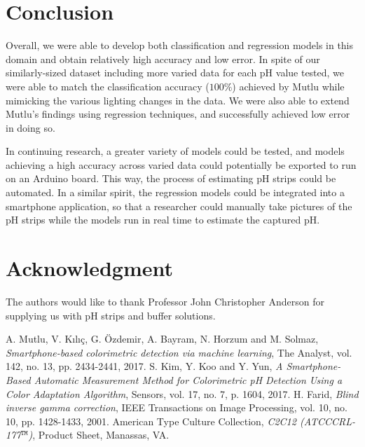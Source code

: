 \documentclass[journal]{IEEEtran}
\begin{document}
\section{Conclusion}
Overall, we were able to develop both classification and regression models in this domain and obtain relatively high accuracy and low error. In spite of our similarly-sized dataset including more varied data for each pH value tested, we were able to match the classification accuracy ($100\%$) achieved by Mutlu while mimicking the various lighting changes in the data. We were also able to extend Mutlu’s findings using regression techniques, and successfully achieved low error in doing so.

In continuing research, a greater variety of models could be tested, and models achieving a high accuracy across varied data could potentially be exported to run on an Arduino board. This way, the process of estimating pH strips could be automated. In a similar spirit, the regression models could be integrated into a smartphone application, so that a researcher could manually take pictures of the pH strips while the models run in real time to estimate the captured pH. 

\appendices
\section*{Acknowledgment}
The authors would like to thank Professor John Christopher Anderson for supplying us with pH strips and buffer solutions.


%
%
%
\begin{thebibliography}{1}
  
\bibitem{} A. Mutlu, V. Kılıç, G. Özdemir, A. Bayram, N. Horzum and M. Solmaz, \emph{Smartphone-based colorimetric detection via machine learning}, The Analyst, vol. 142, no. 13, pp. 2434-2441, 2017.
\bibitem{} S. Kim, Y. Koo and Y. Yun, \emph{A Smartphone-Based Automatic Measurement Method for Colorimetric pH Detection Using a Color Adaptation Algorithm}, Sensors, vol. 17, no. 7, p. 1604, 2017.
\bibitem{} H. Farid, \emph{Blind inverse gamma correction}, IEEE Transactions on Image Processing, vol. 10, no. 10, pp. 1428-1433, 2001.
\bibitem{} American Type Culture Collection, \emph{C2C12 (ATCC\textregistered CRL-177$^\texttt{TM}$)}, Product Sheet, Manassas, VA.

\end{thebibliography}
\end{document}
